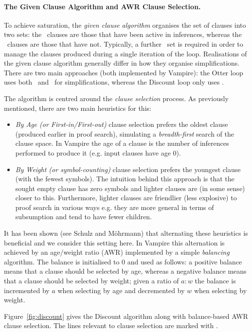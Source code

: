 \documentclass{llncs}
\newcommand{\sandm}{Schulz and M{\"{o}}hrmann}
\begin{document}
\paragraph{The Given Clause Algorithm and AWR Clause Selection.}
To achieve saturation, the \emph{given clause algorithm} organises the set of clauses into two sets: the \Active\ clauses are those that have been active in inferences, whereas the \Passive\ clauses are those that have not. Typically, a further \Unprocessed\ set is required in order to manage the clauses produced during a single iteration of the loop. 
%
Realisations of the given clause algorithm generally differ in how they organise simplifications. There are two main approaches (both implemented by Vampire): the Otter loop uses both \Active\ and \Passive\ for simplifications, whereas the Discount loop only uses \Active. 

The algorithm is centred around the \emph{clause selection} process. As previously mentioned, there are two main heuristics for this:
\begin{itemize}
	\item \emph{By Age (or First-in/First-out)} clause selection prefers the oldest clause (produced earlier in proof search), simulating a \emph{breadth-first} search of the clause space. In Vampire the age of a clause is the number of inferences performed to produce it (e.g. input clauses have age 0).
	\item \emph{By Weight (or symbol-counting)} clause selection prefers the youngest clause (with the fewest symbols). The intuition behind this approach is that the sought empty clause has zero symbols and lighter clauses are (in some sense) closer to this. Furthermore, lighter clauses are friendlier (less explosive) to proof search in various ways e.g. they are more general in terms of subsumption and tend to have fewer children.
\end{itemize}
It has been shown (see \sandm{}) that alternating these heuristics is beneficial and we consider this setting here. In Vampire this alternation is achieved by an age/weight ratio (AWR) implemented by a simple \emph{balancing} algorithm. The balance is initialised to 0 and used as follows: a positive balance means that a clause should be selected by age, whereas a negative balance means that a clause should be selected by weight; given a ratio of $a:w$ the balance is incremented by $a$ when selecting by age and decremented by $w$ when selecting by weight.

Figure~\ref{fig:discount} gives the Discount algorithm along with balance-based AWR clause selection. The lines relevant to clause selection are marked with \Mark.
\end{document}

